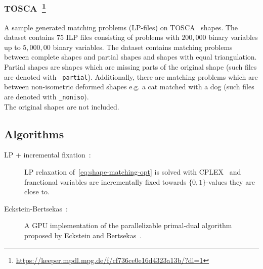 \subsubsection[TOSCA]{TOSCA~\footnote{\url{https://keeper.mpdl.mpg.de/f/cf736ce0e16d4323a13b/?dl=1}}}
A sample generated matching problems (LP-files) on TOSCA~\cite{bronstein2008} shapes. 
The dataset contains $75$ ILP files consisting of problems with $200,000$ binary variables up to $5,000,00$ binary variables.
The dataset contains matching problems between complete shapes and partial shapes and shapes with equal triangulation. Partial shapes are shapes which are missing parts of the original shape (such files are denoted with \texttt{\_partial}). Additionally, there are matching problems which are between non-isometric deformed shapes e.g. a cat matched with a dog (such files are denoted with \texttt{\_noniso}).
\\
The original shapes are not included.

\subsection{Algorithms}
\begin{description}	
	\item[LP + incremental fixation~\cite{windheuser2011geometrically}:]
	LP relaxation of~\eqref{eq:shape-matching-opt} is solved with CPLEX~\cite{cplex} and franctional variables are incrementally fixed towards $\{0,1\}$-values they are close to.
	\item[Eckstein-Bertsekas~\cite{windheuser2011large}:]
	A GPU implementation of the parallelizable primal-dual algorithm proposed by Eckstein and Bertsekas~\cite{eckstein1990alternating}.
\end{description}

